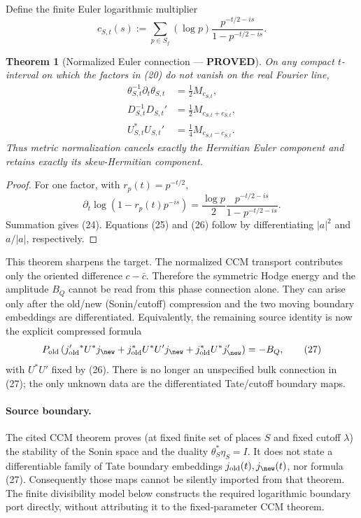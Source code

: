 \documentclass[11pt]{article}
\newtheorem{theorem}{Theorem}
\newcommand{\PROVED}{\textcolor{green!45!black}{\textbf{PROVED}}}
\newcommand{\old}{\mathrm{old}}
\begin{document}
Define the finite Euler logarithmic multiplier
\begin{equation}
 c_{S,t}(s):=\sum_{p\in S_f}(\log p)
 \frac{p^{-t/2-is}}{1-p^{-t/2-is}}.                     \tag{23}
\end{equation}

\begin{theorem}[Normalized Euler connection --- \PROVED]
On any compact $t$-interval on which the factors in (20) do not vanish on the
real Fourier line,
\begin{align}
 \theta_{S,t}^{-1}\partial_t\theta_{S,t}
   &=\frac12M_{c_{S,t}},                                 \tag{24}\\
 D_{S,t}^{-1}D_{S,t}'
   &=\frac12M_{c_{S,t}+\overline{c_{S,t}}},              \tag{25}\\
 U_{S,t}^*U_{S,t}'
   &=\frac14M_{c_{S,t}-\overline{c_{S,t}}}.              \tag{26}
\end{align}
Thus metric normalization cancels exactly the Hermitian Euler component and
retains exactly its skew-Hermitian component.
\end{theorem}

\begin{proof}
For one factor, with $r_p(t)=p^{-t/2}$,
\[
 \partial_t\log(1-r_p(t)p^{-is})
 =\frac{\log p}{2}\frac{p^{-t/2-is}}
 {1-p^{-t/2-is}}.
\]
Summation gives (24).  Equations (25) and (26) follow by differentiating
$|a|^2$ and $a/|a|$, respectively.
\end{proof}

This theorem sharpens the target.  The normalized CCM transport contributes
only the oriented difference $c-\bar c$.  Therefore the symmetric Hodge
energy and the amplitude $B_Q$ cannot be read from this phase connection
alone.  They can arise only after the old/new (Sonin/cutoff) compression and
the two moving boundary embeddings are differentiated.  Equivalently, the
remaining source identity is now the explicit compressed formula
\begin{equation}
 P_{\old}\left(
 j_{\old}'{}^*U^*j_{\new}
 +j_{\old}^*U^*U'j_{\new}
 +j_{\old}^*U^*j_{\new}'
 \right)
 =-B_Q,                                                  \tag{27}
\end{equation}
with $U^*U'$ fixed by (26).  There is no longer an unspecified bulk
connection in (27); the only unknown data are the differentiated Tate/cutoff
boundary maps.

\paragraph{Source boundary.}
The cited CCM theorem proves (at fixed finite set of places $S$ and fixed
cutoff $\lambda$) the stability of the Sonin space and the duality
$\theta_S^*\eta_S=I$.  It does not state a differentiable family of Tate
boundary embeddings $j_{\old}(t),j_{\new}(t)$, nor formula (27).  Consequently
those maps cannot be silently imported from that theorem.  The finite
divisibility model below constructs the required logarithmic boundary port
directly, without attributing it to the fixed-parameter CCM theorem.
\end{document}
